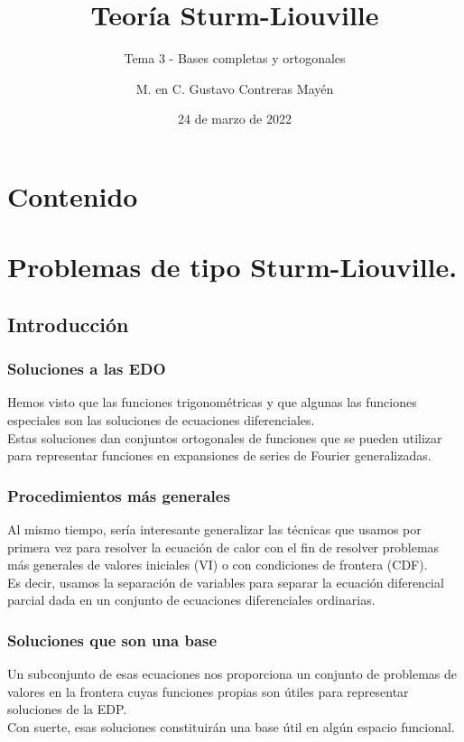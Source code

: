 \documentclass[12pt]{beamer}
\date{24 de marzo de 2022}
\title{\large{Teoría Sturm-Liouville}}
\subtitle{Tema 3 - Bases completas y ortogonales}
\author{M. en C. Gustavo Contreras Mayén}
\begin{document}
\maketitle
\fontsize{14}{14}\selectfont
{}

\section*{Contenido}


\section{Problemas de tipo Sturm-Liouville.}
\subsection{Introducción}

\begin{frame}
\frametitle{Soluciones a las EDO}
Hemos visto que las funciones trigonométricas y que algunas las funciones especiales son las soluciones de ecuaciones diferenciales.
\\
\bigskip
\pause
Estas soluciones dan conjuntos ortogonales de funciones que se pueden utilizar para representar funciones en expansiones de series de Fourier generalizadas.
\end{frame}
\begin{frame}
\frametitle{Procedimientos más generales}
Al mismo tiempo, sería interesante generalizar las técnicas que usamos por primera vez para resolver la ecuación de calor con el fin de resolver problemas más generales de valores iniciales (VI) o con condiciones de frontera (CDF).
\\
\bigskip
\pause
 Es decir, usamos la separación de variables para separar la ecuación diferencial parcial dada en un conjunto de ecuaciones diferenciales ordinarias.
\end{frame}
\begin{frame}
\frametitle{Soluciones que son una base}
Un subconjunto de esas ecuaciones nos proporciona un conjunto de problemas de valores en la frontera cuyas funciones propias son útiles para representar soluciones de la EDP.
\\
\bigskip
\pause
Con suerte, esas soluciones constituirán una base útil en algún espacio funcional.
\end{frame}
\end{document}
